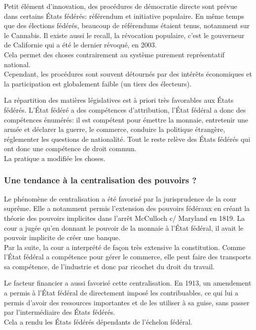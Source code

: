 \documentclass[10pt, a4paper, openany]{book}
\begin{document}
Petit élément d'innovation, des procédures de démocratie directe sont prévue dans certains États fédérés: référendum et initiative populaire. En même temps que des élections fédérés, beaucoup de référendums étaient tenus, notamment sur le Cannabis. Il existe aussi le recall, la révocation populaire, c'est le gouverneur de Californie qui a été le dernier révoqué, en 2003. \\
Cela permet des choses contrairement au système purement représentatif national. \\
Cependant, les procédures sont souvent détournés par des intérêts économiques et la participation est globalement faible (un tiers des électeurs).


La répartition des matières législatives est à priori très favorables aux États fédérés. L'État fédéré a des compétences d'attribution, l'État fédéral a donc des compétences énumérés: il est compétent pour émettre la monnaie, entretenir une armée et déclarer la guerre, le commerce, conduire la politique étrangère, réglementer les questions de nationalité. Tout le reste relève des États fédérés qui ont donc une compétence de droit commun. \\
La pratique a modifiée les choses.

\subsubsection{Une tendance à la centralisation des pouvoirs ?}

Le phénomène de centralisation a été favorisé par la jurisprudence de la cour suprême. Elle a notamment permis l'extension des pouvoirs fédéraux en créant la théorie des pouvoirs implicites dans l'arrêt McCulloch c/ Maryland en 1819. La cour a jugée qu'en donnant le pouvoir de la monnaie à l'État fédéral, il avait le pouvoir implicite de créer une banque. \\
Par la suite, la cour a interprété de façon très extensive la constitution. Comme l'État fédéral a compétence pour gérer le commerce, elle peut faire des transports sa compétence, de l'industrie et donc par ricochet du droit du travail.


Le facteur financier a aussi favorisé cette centralisation. En 1913, un amendement a permis à l'État fédéral de directement imposé les contribuables, ce qui lui a permis d'avoir des ressources importantes et de les utiliser à sa guise, sans passer par l'intermédiaire des États fédérés. \\
Cela a rendu les États fédérés dépendants de l'échelon fédéral.
\end{document}

